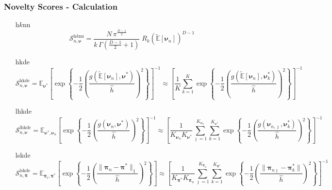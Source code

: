 \documentclass[aspectratio=169,10pt,notes]{beamer}
\begin{document}
\begin{frame}
    \frametitle{Novelty Scores - Calculation}
    \label{ndpg:noveltyscoresdetail}
    {\footnotesize
    \begin{enumerate}
        \item[h$k$nn]
        \[
        \mathcal{S}_{n,\bm{\nu}}^{\text{h$k$nn}} = 
            \frac{N\,\pi^{\frac{D-1}{2}}}{k\,\Gamma\left(\frac{D-1}{2} + 1\right)}
            \;R_{k}\left(\tilde{\mathbb{E}}[\bm{\nu}_n]\right)^{D-1}
        \]
        \item[hkde]
        \[
        \mathcal{S}_{n,\bm{\nu}}^{\text{hkde}} = \mathbb{E}_{\bm{\nu}^*}\left[
            \exp\left\lbrace
            -\frac{1}{2}\left(
            \frac{g(\tilde{\mathbb{E}}[\bm{\nu}_n], \bm{\nu}^*)}{\hat{h}}
            \right)^2
            \right\rbrace
            \right]^{-1} \approx \left[\frac{1}{K}\sum_{k = 1}^{K}
                \exp\left\lbrace-\frac{1}{2}\left(
                \frac{g(\tilde{\mathbb{E}}[\bm{\nu}_n],\bm{\nu}_k^*)}{\hat{h}}
                \right)^2\right\rbrace\right]^{-1}
        \]
        \item[lhkde]
        \[
        \mathcal{S}_{n,\bm{\nu}}^{\text{lhkde}} = 
            \mathbb{E}_{\bm{\nu}^*,\bm{\nu}_n}\left[
            \exp\left\lbrace
            -\frac{1}{2}\left(
            \frac{g(\bm{\nu}_n, \bm{\nu}^*)}{\hat{h}}
            \right)^2
            \right\rbrace
            \right]^{-1} \approx \left[
                \frac{1}{K_{\bm{\nu}_n}K_{\bm{\nu}^*}}
                \sum_{\jmath = 1}^{K_{\bm{\nu}_n}}\sum_{k = 1}^{K_{\bm{\nu}^*}}
                \exp\left\lbrace-\frac{1}{2}
                \left(\frac{g(\bm{\nu}_{n,\jmath},\bm{\nu}_{k}^*)}{\hat{h}}\right)^2
                \right\rbrace
                \right]^{-1}
        \]
        \item[lskde]
        \[
        \mathcal{S}_{n,\bm{\pi}}^{\text{lskde}} = \mathbb{E}_{\bm{\pi}_i,\bm{\pi}^*}
        \left[\exp\left\lbrace -\frac{1}{2}\left(
            \frac{\lVert \bm{\pi}_n - \bm{\pi}^*\rVert_1}{\hat{h}}
            \right)^2\right\rbrace
        \right]
        \approx 
        \left[
            \frac{1}{K_{\bm{\pi}^*}K_{\bm{\pi}_n}}\sum_{\jmath=1}^{K_{\bm{\pi}_n}}
                \sum_{k=1}^{K_{\bm{\pi}^*}}\exp\left\lbrace
            -\frac{1}{2}
                \left(\frac{\lVert \bm{\pi}_{n\jmath} - \bm{\pi}_k^*\rVert}{\hat{h}}\right)^2
            \right\rbrace
        \right]^{-1}
        \]
    \end{enumerate}
    }
    \hyperlink{ndpg:noveltyscores}{}
\end{frame} %
\end{document}
